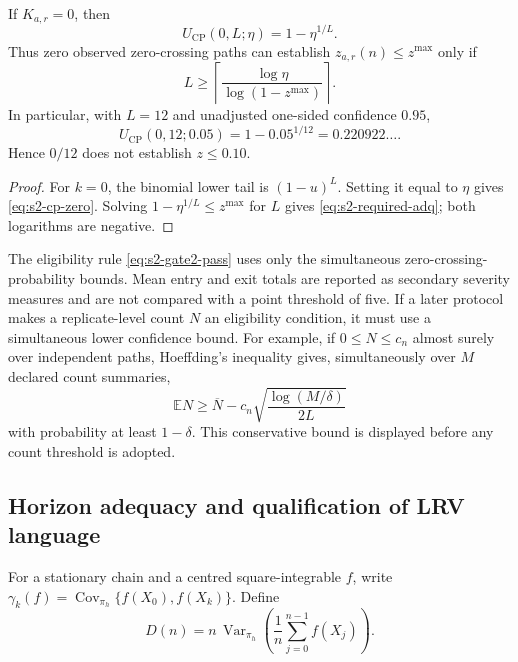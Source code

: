 \begin{corollary}
\label{cor:s2-gate2-count}
If \(K_{a,r}=0\), then
\begin{equation}
 U_{\mathrm{CP}}(0,L;\eta)
 =
 1-\eta^{1/L}.
 \label{eq:s2-cp-zero}
\end{equation}
Thus zero observed zero-crossing paths can establish
\(z_{a,r}(n)\leq z^{\max}\) only if
\begin{equation}
 L
 \geq
 \left\lceil
  \frac{\log\eta}{\log(1-z^{\max})}
 \right\rceil.
 \label{eq:s2-required-adq}
\end{equation}
In particular, with \(L=12\) and unadjusted one-sided confidence \(0.95\),
\[
 U_{\mathrm{CP}}(0,12;0.05)
 =
 1-0.05^{1/12}
 =
 0.220922\ldots.
\]
Hence \(0/12\) does not establish \(z\leq0.10\).
\end{corollary}

\begin{proof}
For \(k=0\), the binomial lower tail is \((1-u)^L\).  Setting it equal to
\(\eta\) gives \eqref{eq:s2-cp-zero}.  Solving
\(1-\eta^{1/L}\leq z^{\max}\) for \(L\) gives
\eqref{eq:s2-required-adq}; both logarithms are negative.
\end{proof}

\begin{remark}
\label{rem:s2-entry-exit}
The eligibility rule \eqref{eq:s2-gate2-pass} uses only the simultaneous
zero-crossing-probability bounds.  Mean entry and exit totals are reported as
secondary severity measures and are not compared with a point threshold of
five.  If a later protocol makes a replicate-level count \(N\) an eligibility
condition, it must use a simultaneous lower confidence bound.  For example,
if \(0\leq N\leq c_n\) almost surely over independent paths, Hoeffding's
inequality gives, simultaneously over \(M\) declared count summaries,
\[
 \mathbb E N
 \geq
 \overline N
 -
 c_n\sqrt{\frac{\log(M/\delta)}{2L}}
\]
with probability at least \(1-\delta\).  This conservative bound is displayed
before any count threshold is adopted.
\end{remark}

\subsection{Horizon adequacy and qualification of LRV language}
\label{subsec:stage2-horizon}

For a stationary chain and a centred square-integrable \(f\), write
\(\gamma_k(f)=\operatorname{Cov}_{\pi_h}\{f(X_0),f(X_k)\}\).  Define
\[
 D(n)
 =
 n\,\operatorname{Var}_{\pi_h}
 \left(\frac1n\sum_{j=0}^{n-1}f(X_j)\right).
\]

